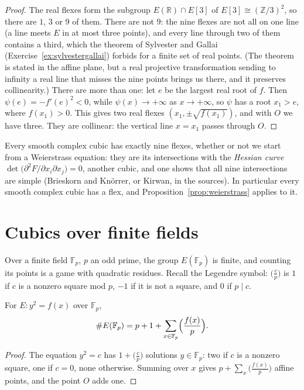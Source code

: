 \begin{proof}
The real flexes form the subgroup $E(\mathbb R)\cap E[3]$ of $E[3]\cong(\mathbb Z/3)^2$, so there are $1$, $3$ or $9$ of them. There are not $9$: the nine
flexes are not all on one line (a line meets $E$ in at most three points), and every line through two of them contains a third, which the theorem of
Sylvester and Gallai (Exercise~\ref{ex:sylvestergallai}) forbids for a finite set of real points. (The theorem is stated in the affine plane, but a real projective
transformation sending to infinity a real line that misses the nine points brings us there, and it preserves collinearity.) There are more than one: let $e$ be the largest real root of
$f$. Then $\psi(e)=-f'(e)^2<0$, while $\psi(x)\to+\infty$ as $x\to+\infty$, so $\psi$ has a root $x_1>e$, where $f(x_1)>0$. This gives two real flexes
$(x_1,\pm\sqrt{f(x_1)})$, and with $O$ we have three. They are collinear: the vertical line $x=x_1$ passes through $O$.
\end{proof}

\begin{remark}
Every smooth complex cubic has exactly nine flexes, whether or not we start from a Weierstrass equation: they are its intersections with the
\emph{Hessian curve} $\det\bigl(\partial^2F/\partial x_i\partial x_j\bigr)=0$, another cubic, and one shows that all nine intersections are simple (Brieskorn
and Kn\"orrer, or Kirwan, in the sources). In particular every smooth complex cubic has a flex, and Proposition~\ref{prop:weierstrass} applies to it.
\end{remark}

\section{Cubics over finite fields}

Over a finite field $\mathbb F_p$, $p$ an odd prime, the group $E(\mathbb F_p)$ is finite, and counting its points is a game with quadratic residues.
Recall the Legendre symbol: $\bigl(\frac cp\bigr)$ is $1$ if $c$ is a nonzero square mod $p$, $-1$ if it is not a square, and $0$ if $p\mid c$.

\begin{proposition}\label{prop:countEp}
For $E:y^2=f(x)$ over $\mathbb F_p$,
\[
\# E(\mathbb F_p)=p+1+\sum_{x\in\mathbb F_p}\Bigl(\frac{f(x)}p\Bigr).
\]
\end{proposition}

\begin{proof}
The equation $y^2=c$ has $1+\bigl(\frac cp\bigr)$ solutions $y\in\mathbb F_p$: two if $c$ is a nonzero square, one if $c=0$, none otherwise. Summing over $x$
gives $p+\sum_x\bigl(\frac{f(x)}p\bigr)$ affine points, and the point $O$ adds one.
\end{proof}

